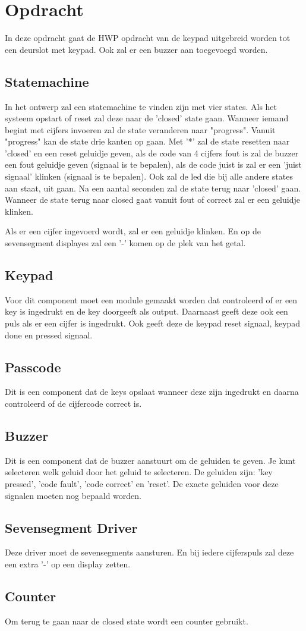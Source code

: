 \section{Opdracht}
In deze opdracht gaat de HWP opdracht van de keypad uitgebreid worden tot een deurslot met keypad. Ook zal er een buzzer aan toegevoegd worden.

\subsection{Statemachine}
In het ontwerp zal een statemachine te vinden zijn met vier states. Als het systeem opstart of reset zal deze naar de 'closed' state gaan. Wanneer iemand begint met cijfers invoeren zal de state veranderen naar "progress". Vanuit "progress" kan de state drie kanten op gaan. Met '*' zal de state resetten naar 'closed' en een reset geluidje geven, als de code van 4 cijfers fout is zal de buzzer een fout geluidje geven (signaal is te bepalen), als de code juist is zal er een 'juist signaal' klinken (signaal is te bepalen). Ook zal de led die bij alle andere states aan staat, uit gaan. Na een aantal seconden zal de state terug naar 'closed' gaan. Wanneer de state terug naar closed gaat vanuit fout of correct zal er een geluidje klinken.

Als er een cijfer ingevoerd wordt, zal er een geluidje klinken. En op de sevensegment displayes zal een '-' komen op de plek van het getal.

\subsection{Keypad} 
Voor dit component moet een module gemaakt worden dat controleerd of er een key is ingedrukt en de key doorgeeft als output. Daarnaast geeft deze ook een puls als er een cijfer is ingedrukt. Ook geeft deze de keypad reset signaal, keypad done en pressed signaal.

\subsection{Passcode}
Dit is een component dat de keys opslaat wanneer deze zijn ingedrukt en daarna controleerd of de cijfercode correct is.

\subsection{Buzzer}
Dit is een component dat de buzzer aanstuurt om de geluiden te geven. Je kunt selecteren welk geluid door het geluid te selecteren. De geluiden zijn: 'key pressed', 'code fault', 'code correct' en 'reset'. De exacte geluiden voor deze signalen moeten nog bepaald worden.

\subsection{Sevensegment Driver}
Deze driver moet de sevensegments aansturen. En bij iedere cijferspuls zal deze een extra '-' op een display zetten.

\subsection{Counter}
Om terug te gaan naar de closed state wordt een counter gebruikt.
